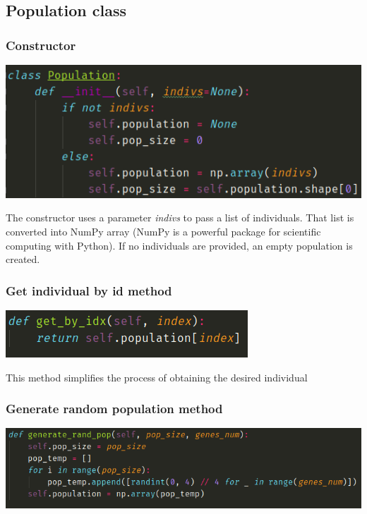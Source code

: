 \documentclass[12pt]{article}
\begin{document}
\subsection{Population class}

\subsubsection{Constructor}
\begin{center}
	\includegraphics[scale=0.5]{pop_constr}
\end{center}

The constructor uses a parameter \emph{indivs} to pass a list of individuals. That list is converted into NumPy array (NumPy is a
 powerful package for scientific computing with Python).
If no individuals are provided, an empty population is created. 


\subsubsection{Get individual by id method}
\begin{center}
	\includegraphics[scale=0.5]{pop_get_by_idx}
\end{center}

This method simplifies the process of obtaining the desired individual


\subsubsection{Generate random population method}
\begin{center}
	\includegraphics[scale=0.5]{pop_gen_rand_pop}
\end{center}
\end{document}
